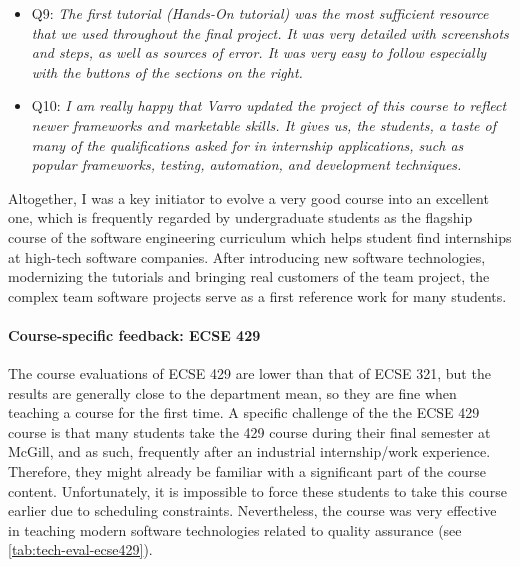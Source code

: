 \begin{itemize}[leftmargin=0.5cm]
\item Q9: \emph{The first tutorial (Hands-On tutorial) was the most sufficient resource that we used throughout the final project. It was very detailed with screenshots and steps, as well as sources of error. It was very easy to follow especially with the buttons of the sections on the right. }
\item Q10: \emph{ I am really happy that Varro updated the project of this course to reflect newer frameworks and marketable skills. It gives us, the students, a taste of many of the qualifications asked for in internship applications, such as popular frameworks, testing, automation, and development techniques. }
\end{itemize}

Altogether, I was a key initiator to evolve a very good course into an excellent one, which is frequently regarded by undergraduate students as the flagship course of the software engineering curriculum which helps student find internships at high-tech software companies. After introducing new software technologies, modernizing the tutorials and bringing real customers of the team project, the complex team software projects serve as a first reference work for many students. 

\paragraph{Course-specific feedback: ECSE 429}
The course evaluations of ECSE 429 are lower than that of ECSE 321, but the results are generally close to the department 
mean, so they are fine when teaching a course for the first time.  A specific challenge of the the ECSE 429 course is that 
many students take the 429 course during their final semester at McGill, and as such, frequently after an industrial 
internship/work experience. Therefore, they might already be familiar with a significant part of the course content. 
Unfortunately, it is impossible to force these students to take this course earlier due to scheduling constraints. Nevertheless, 
the course was very effective in teaching modern software technologies related to quality assurance (see \autoref{tab:tech-eval-ecse429}).



